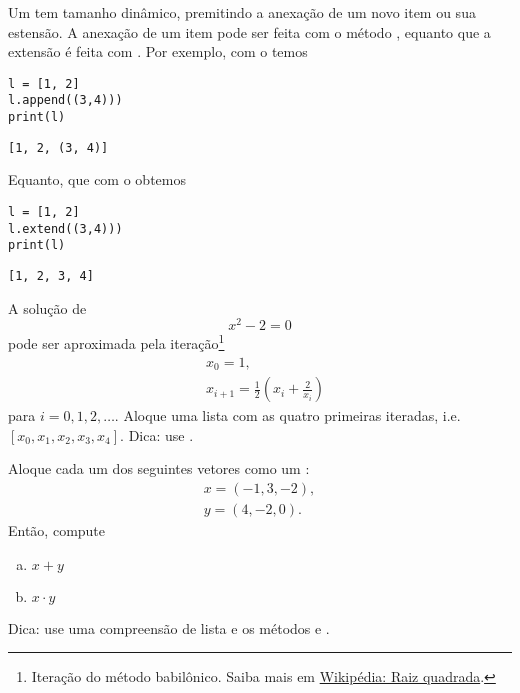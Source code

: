 \documentclass[a4paper,10pt,twoside]{article}
\begin{document}
\begin{obs}
  Um {\PYTHONlist} tem tamanho dinâmico, premitindo a anexação de um novo item ou sua estensão. A anexação de um item pode ser feita com o método {\PYTHONlistDOTappend}, equanto que a extensão é feita com {\PYTHONlistDOTextend}. Por exemplo, com o {\PYTHONlistDOTappend} temos

\begin{lstlisting}
l = [1, 2]
l.append((3,4)))
print(l)
\end{lstlisting}

\begin{verbatim}
[1, 2, (3, 4)]
\end{verbatim}

Equanto, que com o {\PYTHONlistDOTextend} obtemos

\begin{lstlisting}
l = [1, 2]
l.extend((3,4)))
print(l)
\end{lstlisting}
  
\begin{verbatim}
[1, 2, 3, 4]
\end{verbatim}
  
\end{obs}

\begin{exr}
  A solução de
  \begin{equation}
    x^2 - 2 = 0
  \end{equation}
  pode ser aproximada pela iteração\footnote{Iteração do método babilônico. Saiba mais em \href{https://pt.wikipedia.org/wiki/Raiz_quadrada\#M\%C3\%A9todo_babil\%C3\%B4nico}{Wikipédia: Raiz quadrada}.}
  \begin{align}
    &x_0 = 1,\\
    &x_{i+1} = \frac{1}{2}\left(x_{i} + \frac{2}{x_i}\right)
  \end{align}
  para $i = 0, 1, 2, \ldots$. Aloque uma lista com as quatro primeiras iteradas, i.e. $[x_0, x_1, x_2, x_3, x_4]$. Dica: use {\PYTHONlistDOTappend}.
\end{exr}

\begin{exr}
  Aloque cada um dos seguintes vetores como um {\PYTHONlist}:
  \begin{align}
    x = (-1, 3, -2),\\
    y = (4, -2, 0).
  \end{align}
  Então, compute
  \begin{enumerate}[a)]
  \item $x+y$
  \item $x\cdot y$
  \end{enumerate}
  Dica: use uma compreensão de lista e os métodos {\PYTHONzip} e {\PYTHONsum}.
\end{exr}
\end{document}

